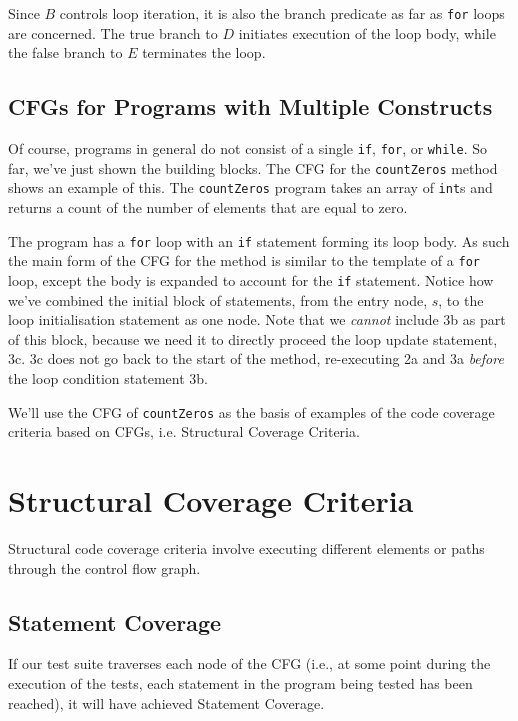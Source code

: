 Since $B$ controls loop iteration, it is also the branch predicate as far as
{\tt for} loops are concerned. The true branch to $D$ initiates execution of the
loop body, while the false branch to $E$ terminates the loop.


\subsection{CFGs for Programs with Multiple Constructs}

Of course, programs in general do not consist of a single {\tt if}, {\tt for},
or {\tt while}. So far, we've just shown the building blocks. The CFG for the
{\tt countZeros} method shows an example of this. The {\tt countZeros} program
takes an array of {\tt int}s and returns a count of the number of elements that
are equal to zero.


The program has a {\tt for} loop with an {\tt if} statement forming its loop
body. As such the main form of the CFG for the method is similar to the template
of a {\tt for} loop, except the body is expanded to account for the {\tt if}
statement. Notice how we've combined the initial block of statements, from the
entry node, $s$, to the loop initialisation statement as one node. Note that we
{\it cannot} include 3b as part of this block, because we need it to directly
proceed the loop update statement, 3c. 3c does not go back to the start of the
method, re-executing 2a and 3a {\it before} the loop condition statement 3b.

We'll use the CFG of {\tt countZeros} as the basis of examples of the code
coverage criteria based on CFGs, i.e. Structural Coverage Criteria.


\section{Structural Coverage Criteria}

Structural code coverage criteria involve executing different elements or paths
through the control flow graph.

\subsection{Statement Coverage} 

If our test suite traverses each node of the CFG (i.e., at some point during the
execution of the tests, each statement in the program being tested has been
reached), it will have achieved Statement Coverage. 

